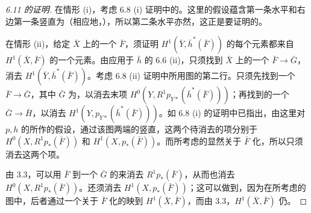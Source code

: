 \begin{proof}[6.11 的证明]
在情形 (i)，考虑 6.8 (i) 证明中的。这里的假设蕴含第一条水平和右边第一条竖直为（相应地，），所以第二条水平亦然，这正是要证明的。

在情形 (ii)，给定 $\bar X$ 上的一个 $\bar F$，须证明 $H^1(\bar Y,\bar h^*(\bar F))$ 的每个元素都来自 $H^1(\bar X,\bar F)$ 的一个元素。由应用于 $\bar h$ 的 6.6 (ii)，只须找到 $\bar X$ 上的一个 $\bar F\to\bar G$，消去 $H^1(\bar Y,\bar h^*(\bar F))$。考虑 6.8 (ii) 证明中所用图的第二行。只须先找到一个 $\bar F\to\bar G$，其中 $\bar G$ 为，以消去末项 $H^0(Y,R^1p_{Y*}(\bar h^*(\bar F)))$；再找到的一个 $\bar G\to\bar H$，以消去 $H^1(Y,p_{Y*}(\bar h^*(\bar F)))$。如 6.8 (i) 的证明中已指出，由这里对 $p,h$ 的所作的假设，通过该图两端的竖直，这两个待消去的项分别于 $H^0(X,R^1p_*(\bar F))$ 和 $H^1(X,p_*(\bar F))$。而所考虑的显然关于 $\bar F$ 化，所以只须消去这两个项。

由 3.3，可以用 $\bar F$ 到一个 $\bar G$ 的来消去 $R^1p_*(\bar F)$，从而也消去 $H^0(X,R^1p_*(\bar F))$。还须消去 $H^1(X,p_*(\bar F))$；这可以做到，因为在所考虑的图中，后者通过一个关于 $\bar F$ 化的映到 $H^1(\bar X,\bar F)$，而由 3.3，$H^1(\bar X,\bar F)$ 仍。


\end{proof}

